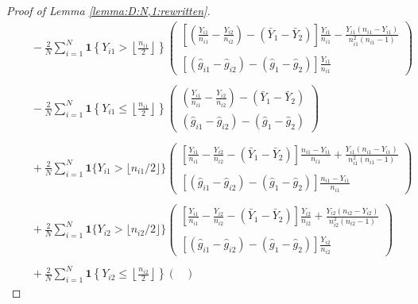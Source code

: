 \documentclass[12pt,letterpaper]{article}
\begin{document}
\begin{proof}[Proof of Lemma \ref{lemma:D:N,1:rewritten}]
\begin{equation}
\begin{array}{rl}
&\quad\displaystyle-\frac{2}{N}\sum_{i=1}^N\mathbf{1}\left\{Y_{i1}>\left\lfloor\frac{n_{i1}}{2}\right\rfloor\right\}\begin{pmatrix}
\displaystyle\left[\left(\frac{Y_{i1}}{n_{i1}}-\frac{Y_{i2}}{n_{i2}}\right)-(\bar{Y}_1-\bar{Y}_2)\right]\frac{Y_{i1}}{n_{i1}}-\frac{Y_{i1}(n_{i1}-Y_{i1})}{n_{i1}^2(n_{i1}-1)}\\
\\
\displaystyle[(\hat{g}_{i1}-\hat{g}_{i2})-(\hat{g}_1-\hat{g}_2)]\frac{Y_{i1}}{n_{i1}}
\end{pmatrix}\\
\\
&\quad\displaystyle-\frac{2}{N}\sum_{i=1}^N\mathbf{1}\left\{Y_{i1}\leq\left\lfloor \frac{n_{i1}}{2}\right\rfloor\right\}\begin{pmatrix}
\displaystyle\left(\frac{Y_{i1}}{n_{i1}}-\frac{Y_{i2}}{n_{i2}}\right)-(\bar{Y}_1-\bar{Y}_2)\\
\displaystyle(\hat{g}_{i1}-\hat{g}_{i2})-(\hat{g}_1-\hat{g}_2)
\end{pmatrix}\\
\\
&\quad\displaystyle+\frac{2}{N}\sum_{i=1}^N\mathbf{1}\{Y_{i1} > \lfloor n_{i1}/2\rfloor\}\begin{pmatrix}
\displaystyle\left[\frac{Y_{i1}}{n_{i1}}-\frac{Y_{i2}}{n_{i2}}-(\bar{Y}_1-\bar{Y}_2)\right]\frac{n_{i1}-Y_{i1}}{n_{i1}}+\frac{Y_{i1}(n_{i1}-Y_{i1})}{n_{i1}^2(n_{i1}-1)}\\
\\
\displaystyle\left[(\hat{g}_{i1}-\hat{g}_{i2})-(\hat{g}_1-\hat{g}_2)\right]\frac{n_{i1}-Y_{i1}}{n_{i1}}
\end{pmatrix}\\
\\
&\displaystyle\quad+\frac{2}{N}\sum_{i=1}^N\mathbf{1}\{Y_{i2} > \lfloor n_{i2}/2\rfloor\}\begin{pmatrix}
\displaystyle\left[\frac{Y_{i1}}{n_{i1}}-\frac{Y_{i2}}{n_{i2}}-(\bar{Y}_1-\bar{Y}_2)\right]\frac{Y_{i2}}{n_{i2}}+\frac{Y_{i2}(n_{i2}-Y_{i2})}{n_{i2}^2(n_{i2}-1)}\\
\\
\displaystyle[(\hat{g}_{i1}-\hat{g}_{i2})-(\hat{g}_1-\hat{g}_2)]\frac{Y_{i2}}{n_{i2}}
\end{pmatrix}\\
\\
&\displaystyle\quad+\frac{2}{N}\sum_{i=1}^N\mathbf{1}\left\{Y_{i2}\leq\left\lfloor\frac{n_{i2}}{2}\right\rfloor\right\}\begin{pmatrix}

\end{pmatrix}
\end{array}
\end{equation}
\end{proof}
\end{document}

